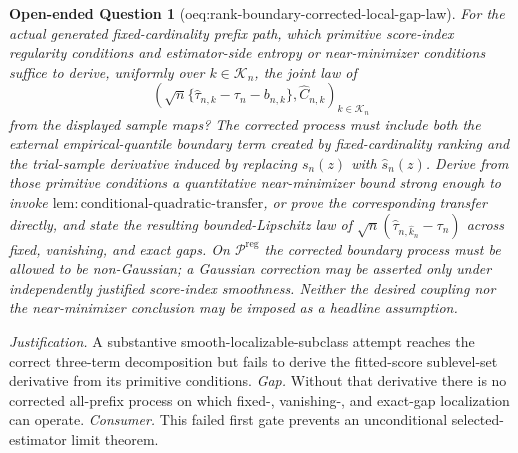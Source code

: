 \documentclass{article}
\newtheorem{openendedquestion}{Open-ended Question}
\begin{document}
\begin{openendedquestion}[oeq:rank-boundary-corrected-local-gap-law]\label{oeq:rank-boundary-corrected-local-gap-law}
For the actual generated fixed-cardinality prefix path, which primitive score-index regularity conditions and estimator-side entropy or near-minimizer conditions suffice to derive, uniformly over \(k\in\mathcal K_n\), the joint law of
\[
 \left(
 \sqrt n\{\widehat\tau_{n,k}-\tau_n-b_{n,k}\},
 \widehat C_{n,k}
 \right)_{k\in\mathcal K_n}
\]
from the displayed sample maps?  The corrected process must include both the external empirical-quantile boundary term created by fixed-cardinality ranking and the trial-sample derivative induced by replacing \(s_n(z)\) with \(\widehat s_n(z)\).  Derive from those primitive conditions a quantitative near-minimizer bound strong enough to invoke \(\mathrm{lem:conditional\text{-}quadratic\text{-}transfer}\), or prove the corresponding transfer directly, and state the resulting bounded-Lipschitz law of \(\sqrt n(\widehat\tau_{n,\widehat k_n}-\tau_n)\) across fixed, vanishing, and exact gaps.  On \(\mathcal P^{\mathrm{reg}}\) the corrected boundary process must be allowed to be non-Gaussian; a Gaussian correction may be asserted only under independently justified score-index smoothness.  Neither the desired coupling nor the near-minimizer conclusion may be imposed as a headline assumption.
\end{openendedquestion}
\par\smallskip\noindent \textit{Justification.} A substantive smooth-localizable-subclass attempt reaches the correct three-term decomposition but fails to derive the fitted-score sublevel-set derivative from its primitive conditions. \textit{Gap.} Without that derivative there is no corrected all-prefix process on which fixed-, vanishing-, and exact-gap localization can operate. \textit{Consumer.} This failed first gate prevents an unconditional selected-estimator limit theorem.
\end{document}

